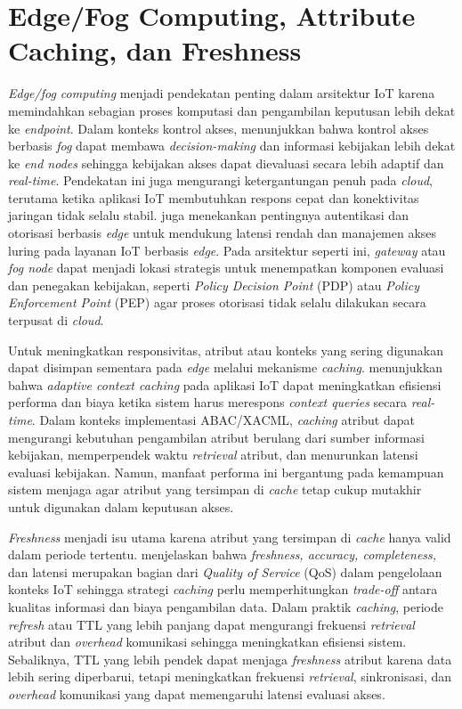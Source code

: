\section{Edge/Fog Computing, Attribute Caching, dan Freshness}

\textit{Edge/fog computing} menjadi pendekatan penting dalam arsitektur IoT karena memindahkan sebagian proses komputasi dan pengambilan keputusan lebih dekat ke \textit{endpoint}. Dalam konteks kontrol akses, \textcite{kalaria_adaptive_2024} menunjukkan bahwa kontrol akses berbasis \textit{fog} dapat membawa \textit{decision-making} dan informasi kebijakan lebih dekat ke \textit{end nodes} sehingga kebijakan akses dapat dievaluasi secara lebih adaptif dan \textit{real-time}. Pendekatan ini juga mengurangi ketergantungan penuh pada \textit{cloud}, terutama ketika aplikasi IoT membutuhkan respons cepat dan konektivitas jaringan tidak selalu stabil. \textcite{wang_edge-enabled_2025} juga menekankan pentingnya autentikasi dan otorisasi berbasis \textit{edge} untuk mendukung latensi rendah dan manajemen akses luring pada layanan IoT berbasis \textit{edge}. Pada arsitektur seperti ini, \textit{gateway} atau \textit{fog node} dapat menjadi lokasi strategis untuk menempatkan komponen evaluasi dan penegakan kebijakan, seperti \textit{Policy Decision Point} (PDP) atau \textit{Policy Enforcement Point} (PEP) agar proses otorisasi tidak selalu dilakukan secara terpusat di \textit{cloud}.

Untuk meningkatkan responsivitas, atribut atau konteks yang sering digunakan dapat disimpan sementara pada \textit{edge} melalui mekanisme \textit{caching}. \textcite{weerasinghe_adaptive_2023} menunjukkan bahwa \textit{adaptive context caching} pada aplikasi IoT dapat meningkatkan efisiensi performa dan biaya ketika sistem harus merespons \textit{context queries} secara \textit{real-time}. Dalam konteks implementasi ABAC/XACML, \textit{caching} atribut dapat mengurangi kebutuhan pengambilan atribut berulang dari sumber informasi kebijakan, memperpendek waktu \textit{retrieval} atribut, dan menurunkan latensi evaluasi kebijakan. Namun, manfaat performa ini bergantung pada kemampuan sistem menjaga agar atribut yang tersimpan di \textit{cache} tetap cukup mutakhir untuk digunakan dalam keputusan akses.

\textit{Freshness} menjadi isu utama karena atribut yang tersimpan di \textit{cache} hanya valid dalam periode tertentu. \textcite{medvedev_refresh_2023} menjelaskan bahwa \textit{freshness, accuracy, completeness,} dan latensi merupakan bagian dari \textit{Quality of Service} (QoS) dalam pengelolaan konteks IoT sehingga strategi \textit{caching} perlu memperhitungkan \textit{trade-off} antara kualitas informasi dan biaya pengambilan data. Dalam praktik \textit{caching}, periode \textit{refresh} atau TTL yang lebih panjang dapat mengurangi frekuensi \textit{retrieval} atribut dan \textit{overhead} komunikasi sehingga meningkatkan efisiensi sistem. Sebaliknya, TTL yang lebih pendek dapat menjaga \textit{freshness} atribut karena data lebih sering diperbarui, tetapi meningkatkan frekuensi \textit{retrieval}, sinkronisasi, dan \textit{overhead} komunikasi yang dapat memengaruhi latensi evaluasi akses.

